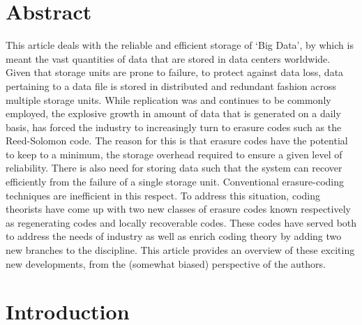 \begin{multicols}{2}
\setcounter{figure}{0}
\section*{Abstract}
\medskip

\noindent
This article deals with the reliable and efficient storage of `Big Data', by which is meant the vast quantities of data that are stored in data centers worldwide.  Given that storage units are prone to failure, to protect against data loss, data pertaining to a data file is stored in distributed and redundant fashion across multiple storage units.  While replication was and continues to be commonly employed, the explosive growth in amount of data that is generated on a daily basis, has forced the industry to increasingly turn to erasure codes such as the Reed-Solomon code.  The reason for this is that erasure codes have the potential to keep to a minimum, the storage overhead required to ensure a given level of reliability.  There is also need for storing data such that the system can recover efficiently from the failure of a single storage unit.  Conventional erasure-coding techniques are inefficient in this respect.  To address this situation, coding theorists have come up with two new classes of erasure codes known respectively as regenerating codes and locally recoverable codes. These codes have served both to address the needs of industry as well as enrich coding theory by adding two new branches to the discipline.  This article provides an overview of these exciting new developments, from the (somewhat biased) perspective of the authors.

\section{Introduction}
	

\end{multicols}
